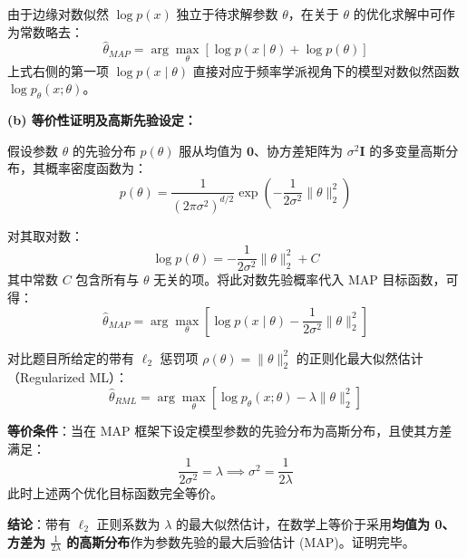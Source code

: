 \documentclass[a4paper, 11pt]{ctexart}
\begin{document}
由于边缘对数似然 $\log p(x)$ 独立于待求解参数 $\theta$，在关于 $\theta$ 的优化求解中可作为常数略去：
\begin{equation}
\hat{\theta}_{MAP} = \arg\max_\theta \left[ \log p(x \mid \theta) + \log p(\theta) \right]
\end{equation}
上式右侧的第一项 $\log p(x \mid \theta)$ 直接对应于频率学派视角下的模型对数似然函数 $\log p_\theta(x; \theta)$。

\textbf{(b) 等价性证明及高斯先验设定：}

假设参数 $\theta$ 的先验分布 $p(\theta)$ 服从均值为 $\mathbf{0}$、协方差矩阵为 $\sigma^2 \mathbf{I}$ 的多变量高斯分布，其概率密度函数为：
\begin{equation}
p(\theta) = \frac{1}{(2\pi\sigma^2)^{d/2}} \exp\left(-\frac{1}{2\sigma^2} \|\theta\|_2^2\right)
\end{equation}

对其取对数：
\begin{equation}
\log p(\theta) = -\frac{1}{2\sigma^2} \|\theta\|_2^2 + C
\end{equation}
其中常数 $C$ 包含所有与 $\theta$ 无关的项。将此对数先验概率代入 MAP 目标函数，可得：
\begin{equation}
\hat{\theta}_{MAP} = \arg\max_\theta \left[ \log p(x \mid \theta) - \frac{1}{2\sigma^2} \|\theta\|_2^2 \right]
\end{equation}

对比题目所给定的带有 $\ell_2$ 惩罚项 $\rho(\theta) = \|\theta\|_2^2$ 的正则化最大似然估计（Regularized ML）：
\begin{equation}
\hat{\theta}_{RML} = \arg\max_\theta \left[ \log p_\theta(x; \theta) - \lambda \|\theta\|_2^2 \right]
\end{equation}

\textbf{等价条件}：当在 MAP 框架下设定模型参数的先验分布为高斯分布，且使其方差满足：
\begin{equation}
\frac{1}{2\sigma^2} = \lambda \implies \sigma^2 = \frac{1}{2\lambda}
\end{equation}
此时上述两个优化目标函数完全等价。

\textbf{结论}：带有 $\ell_2$ 正则系数为 $\lambda$ 的最大似然估计，在数学上等价于采用\textbf{均值为 0、方差为 $\frac{1}{2\lambda}$ 的高斯分布}作为参数先验的最大后验估计 (MAP)。证明完毕。
\end{document}
